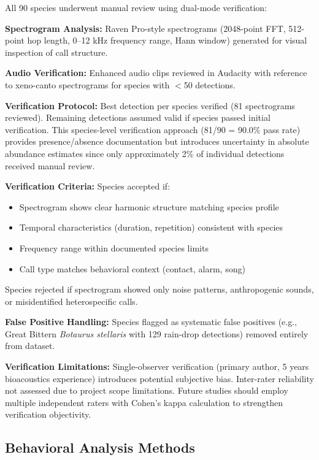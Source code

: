 \documentclass[twocolumn]{article}
\begin{document}
All 90 species underwent manual review using dual-mode verification:

\textbf{Spectrogram Analysis:} Raven Pro-style spectrograms (2048-point FFT, 512-point hop length, 0--12 kHz frequency range, Hann window) generated for visual inspection of call structure.

\textbf{Audio Verification:} Enhanced audio clips reviewed in Audacity with reference to xeno-canto spectrograms for species with $<$50 detections.

\textbf{Verification Protocol:} Best detection per species verified (81 spectrograms reviewed). Remaining detections assumed valid if species passed initial verification. This species-level verification approach (81/90 = 90.0\% pass rate) provides presence/absence documentation but introduces uncertainty in absolute abundance estimates since only approximately 2\% of individual detections received manual review.

\textbf{Verification Criteria:} Species accepted if:
\begin{itemize}
\item Spectrogram shows clear harmonic structure matching species profile
\item Temporal characteristics (duration, repetition) consistent with species
\item Frequency range within documented species limits
\item Call type matches behavioral context (contact, alarm, song)
\end{itemize}

Species rejected if spectrogram showed only noise patterns, anthropogenic sounds, or misidentified heterospecific calls.

\textbf{False Positive Handling:} Species flagged as systematic false positives (e.g., Great Bittern \textit{Botaurus stellaris} with 129 rain-drop detections) removed entirely from dataset.

\textbf{Verification Limitations:} Single-observer verification (primary author, 5 years bioacoustics experience) introduces potential subjective bias. Inter-rater reliability not assessed due to project scope limitations. Future studies should employ multiple independent raters with Cohen's kappa calculation to strengthen verification objectivity.

\subsection{Behavioral Analysis Methods}
\end{document}
